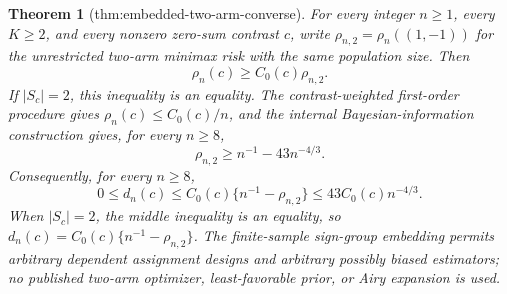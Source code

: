 \documentclass{article}
\newtheorem{theorem}{Theorem}
\begin{document}
\begin{theorem}[thm:embedded-two-arm-converse]\label{thm:embedded-two-arm-converse}
For every integer \(n\geq1\), every \(K\geq2\), and every nonzero zero-sum contrast \(c\), write \(\rho_{n,2}=\rho_n((1,-1))\) for the unrestricted two-arm minimax risk with the same population size. Then
\[
 \rho_n(c)\geq C_0(c)\rho_{n,2}.
\]
If \(|S_c|=2\), this inequality is an equality. The contrast-weighted first-order procedure gives \(\rho_n(c)\leq C_0(c)/n\), and the internal Bayesian-information construction gives, for every \(n\geq8\),
\[
 \rho_{n,2}\geq n^{-1}-43n^{-4/3}.
\]
Consequently, for every \(n\geq8\),
\[
 0\leq d_n(c)\leq C_0(c)\{n^{-1}-\rho_{n,2}\}
 \leq43C_0(c)n^{-4/3}.
\]
When \(|S_c|=2\), the middle inequality is an equality, so \(d_n(c)=C_0(c)\{n^{-1}-\rho_{n,2}\}\). The finite-sample sign-group embedding permits arbitrary dependent assignment designs and arbitrary possibly biased estimators; no published two-arm optimizer, least-favorable prior, or Airy expansion is used.
\end{theorem}
\end{document}
